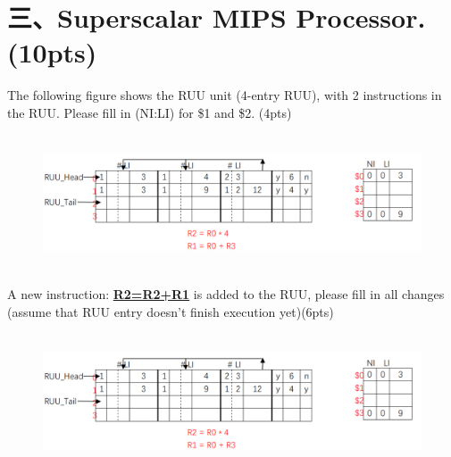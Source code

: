 \documentclass[UTF8]{ctexart}
\begin{document}
\section*{三、Superscalar MIPS Processor. (10pts)}
The following figure shows the RUU unit (4-entry RUU), with 2 instructions in the RUU. Please fill in (NI:LI) for \$1 and \$2. (4pts)\\
\begin{figure}[H]                                             
    \centering                                                
    \includegraphics[width=14cm,height=4cm]{3-1.png}        
    \caption*{}                                                                              
\end{figure}  
A new instruction: \underline{\bfseries R2=R2+R1} is added to the RUU, please fill in all changes (assume that RUU entry doesn't finish execution yet)(6pts)\\
\begin{figure}[H]                                            
    \centering                                                
    \includegraphics[width=14cm,height=4cm]{3-1.png}        
    \caption*{}                                                                                 
\end{figure}  
\end{document}
